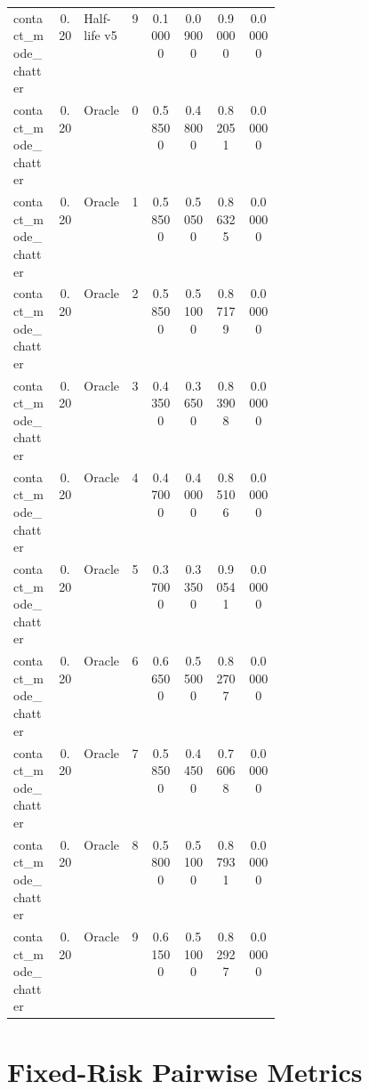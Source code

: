 \documentclass{article}
\begin{document}
\begin{center}
\begin{longtable}{p{0.17\linewidth}cp{0.18\linewidth}ccccc}
contact\_mode\_chatter & 0.20 & Half-life v5 & 9 & 0.10000 & 0.09000 & 0.90000 & 0.00000\\
contact\_mode\_chatter & 0.20 & Oracle & 0 & 0.58500 & 0.48000 & 0.82051 & 0.00000\\
contact\_mode\_chatter & 0.20 & Oracle & 1 & 0.58500 & 0.50500 & 0.86325 & 0.00000\\
contact\_mode\_chatter & 0.20 & Oracle & 2 & 0.58500 & 0.51000 & 0.87179 & 0.00000\\
contact\_mode\_chatter & 0.20 & Oracle & 3 & 0.43500 & 0.36500 & 0.83908 & 0.00000\\
contact\_mode\_chatter & 0.20 & Oracle & 4 & 0.47000 & 0.40000 & 0.85106 & 0.00000\\
contact\_mode\_chatter & 0.20 & Oracle & 5 & 0.37000 & 0.33500 & 0.90541 & 0.00000\\
contact\_mode\_chatter & 0.20 & Oracle & 6 & 0.66500 & 0.55000 & 0.82707 & 0.00000\\
contact\_mode\_chatter & 0.20 & Oracle & 7 & 0.58500 & 0.44500 & 0.76068 & 0.00000\\
contact\_mode\_chatter & 0.20 & Oracle & 8 & 0.58000 & 0.51000 & 0.87931 & 0.00000\\
contact\_mode\_chatter & 0.20 & Oracle & 9 & 0.61500 & 0.51000 & 0.82927 & 0.00000\\
\bottomrule
\end{longtable}
\normalsize
\end{center}

\section{Fixed-Risk Pairwise Metrics}
\end{document}
